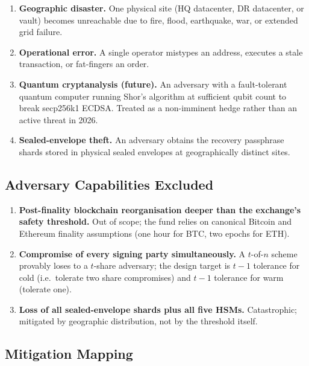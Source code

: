 \begin{enumerate}[nosep]
\item \textbf{Geographic disaster.} One physical site (HQ datacenter,
DR datacenter, or vault) becomes unreachable due to fire, flood,
earthquake, war, or extended grid failure.

\item \textbf{Operational error.} A single operator mistypes an
address, executes a stale transaction, or fat-fingers an order.

\item \textbf{Quantum cryptanalysis (future).} An adversary with a
fault-tolerant quantum computer running Shor's algorithm at sufficient
qubit count to break secp256k1 ECDSA. Treated as a non-imminent
hedge rather than an active threat in 2026.

\item \textbf{Sealed-envelope theft.} An adversary obtains the
recovery passphrase shards stored in physical sealed envelopes at
geographically distinct sites.
\end{enumerate}

\subsection{Adversary Capabilities Excluded}

\begin{enumerate}[nosep]
\item \textbf{Post-finality blockchain reorganisation deeper than the
exchange's safety threshold.} Out of scope; the fund relies on
canonical Bitcoin and Ethereum finality assumptions (one hour for BTC,
two epochs for ETH).

\item \textbf{Compromise of every signing party simultaneously.} A
$t$-of-$n$ scheme provably loses to a $t$-share adversary; the design
target is $t-1$ tolerance for cold (i.e.\ tolerate two share
compromises) and $t-1$ tolerance for warm (tolerate one).

\item \textbf{Loss of all sealed-envelope shards plus all five HSMs.}
Catastrophic; mitigated by geographic distribution, not by the
threshold itself.
\end{enumerate}

\subsection{Mitigation Mapping}

